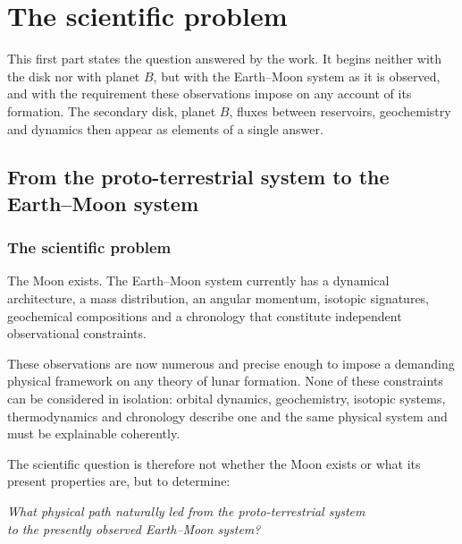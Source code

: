 \documentclass[11pt,a4paper,openany]{report}
\begin{document}
\clearpage
\tableofcontents

\clearpage
{}
\part{The scientific problem}

\noindent
This first part states the question answered by the work. It begins neither with the disk nor with
planet $B$, but with the Earth--Moon system as it is observed, and with the requirement these
observations impose on any account of its formation. The secondary disk, planet $B$, fluxes between
reservoirs, geochemistry and dynamics then appear as elements of a single answer.

\chapter{From the proto-terrestrial system to the Earth--Moon system}
\label{ch:probleme}

\section{The scientific problem}

The Moon exists. The Earth--Moon system currently has a dynamical architecture, a mass
distribution, an angular momentum, isotopic signatures, geochemical compositions and a chronology
that constitute independent observational constraints.

These observations are now numerous and precise enough to impose a demanding physical framework
on any theory of lunar formation. None of these constraints can be considered in isolation:
orbital dynamics, geochemistry, isotopic systems, thermodynamics and chronology describe one and
the same physical system and must be explainable coherently.

The scientific question is therefore not whether the Moon exists or what its present properties
are, but to determine:

\begin{center}
\emph{What physical path naturally led from the proto-terrestrial system\\ to the presently observed
Earth--Moon system?}
\end{center}
\end{document}
